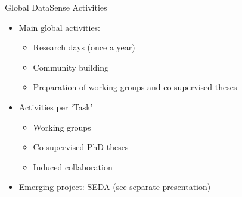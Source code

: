 \begin{frame}{Global DataSense Activities}

  \begin{itemize}
  \item Main global activities:
    \begin{itemize}
    \item Research days (once a year)
    \item Community building
    \item Preparation of working groups and co-supervised theses
    \end{itemize}

  \item Activities per `Task'
    \begin{itemize}
    \item Working groups
    \item Co-supervised PhD theses
    \item Induced collaboration
    \end{itemize}

  \item Emerging project: SEDA (see separate presentation)
  \end{itemize}

\end{frame}

